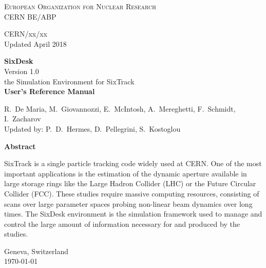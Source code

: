 \begin{titlepage}
\begin{center}\normalsize\scshape
    European Organization for Nuclear Research \\
    CERN BE/ABP
\end{center}
\vspace*{2mm}
\begin{flushright}
    CERN/xx/xx \\
    Updated April 2018
\end{flushright}
\begin{center}\Huge
    \textbf{SixDesk} \\
    \LARGE Version 1.0 \\
    \vspace*{8mm} the Simulation Environment for SixTrack\\
    \vspace*{8mm}\textbf{User's Reference Manual}
\end{center}
\begin{center}
  R.~De Maria, M.~Giovannozzi, E.~McIntosh, A.~Mereghetti, F.~Schmidt,
  I.~Zacharov \\
    \vspace*{4mm}Updated by:
    P.~D.~Hermes, D.~Pellegrini, S.~Kostoglou
\end{center}
\begin{center}\large
    \vspace*{10mm}\textbf{Abstract} \\
\end{center}
SixTrack is a single particle tracking code widely used at CERN. One of the
most important applications is the estimation of the dynamic aperture available
in large storage rings like the Large Hadron Collider (LHC) or the Future
Circular Collider (FCC). These studies require massive computing resources,
consisting of scans over large parameter spaces probing non-linear beam
dynamics over long times. The SixDesk environment is the simulation framework
used to manage and control the large amount of information necessary for and
produced by the studies.
\vfill
\begin{center}
    Geneva, Switzerland \\
    \today
\end{center}

\end{titlepage}
